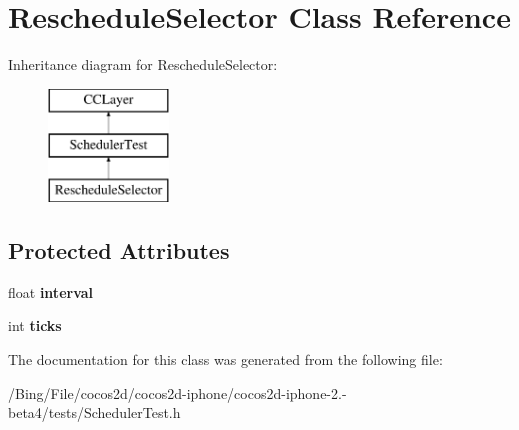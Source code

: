 \hypertarget{interface_reschedule_selector}{\section{Reschedule\-Selector Class Reference}
\label{interface_reschedule_selector}
}
Inheritance diagram for Reschedule\-Selector\-:\begin{figure}[H]
\begin{center}
\leavevmode
\includegraphics[height=3.000000cm]{interface_reschedule_selector}
\end{center}
\end{figure}
\subsection*{Protected Attributes}
\begin{DoxyCompactItemize}
\item 
\hypertarget{interface_reschedule_selector_afbdde9ba6cdea96ba38e42a722d2f894}{float {\bfseries interval}}\label{interface_reschedule_selector_afbdde9ba6cdea96ba38e42a722d2f894}

\item 
\hypertarget{interface_reschedule_selector_ae7f49122687ee15c7b8282e61bbc5b62}{int {\bfseries ticks}}\label{interface_reschedule_selector_ae7f49122687ee15c7b8282e61bbc5b62}

\end{DoxyCompactItemize}


The documentation for this class was generated from the following file\-:\begin{DoxyCompactItemize}
\item 
/\-Bing/\-File/cocos2d/cocos2d-\/iphone/cocos2d-\/iphone-\/2.-\/beta4/tests/Scheduler\-Test.\-h\end{DoxyCompactItemize}
